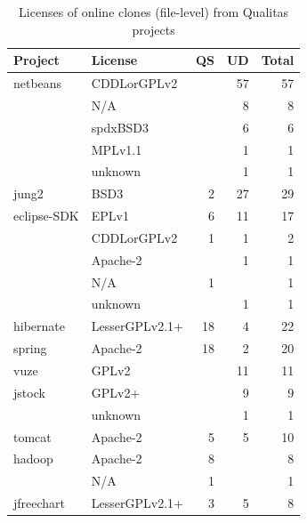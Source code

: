 \documentclass[sigconf,review, anonymous]{acmart}
\begin{document}
\begin{table}
	\centering
	\caption{Licenses of online clones (file-level) from Qualitas projects}
	\label{t:q_projects_license}
	\small
	\begin{tabular}{l|l|r|r|r}
		\hline 
		Project & License & QS & UD & Total \\
		\hline
		netbeans &  CDDLorGPLv2 &  & 57 & 57 \\
		&  N/A &  & 8 & 8 \\
		&  spdxBSD3 &  & 6 & 6 \\
		&  MPLv1.1 &  & 1 & 1 \\
		&  unknown &  & 1 & 1 \\
		\hline
		jung2 &  BSD3 & 2 & 27 & 29 \\
		\hline
		eclipse-SDK & EPLv1 & 6 & 11 & 17 \\
		& CDDLorGPLv2 & 1 & 1 & 2 \\
		&  Apache-2 &  & 1 & 1 \\
		& N/A & 1 &  & 1 \\
		& unknown &  & 1 & 1 \\
		\hline
		hibernate & LesserGPLv2.1+ & 18 & 4 & 22 \\
		\hline
		spring & Apache-2 & 18 & 2 & 20 \\
		\hline
		vuze & GPLv2 &  & 11 & 11 \\
		\hline
		jstock & GPLv2+ &  & 9 & 9 \\
		& unknown &  & 1 & 1 \\
		\hline
		tomcat & Apache-2 & 5 & 5 & 10 \\
		\hline
		hadoop & Apache-2 & 8 &  & 8 \\
		& N/A & 1 &  & 1 \\
		\hline
		jfreechart & LesserGPLv2.1+ & 3 & 5 & 8 \\
		\hline
	\end{tabular} %
\end{table}
\end{document}
